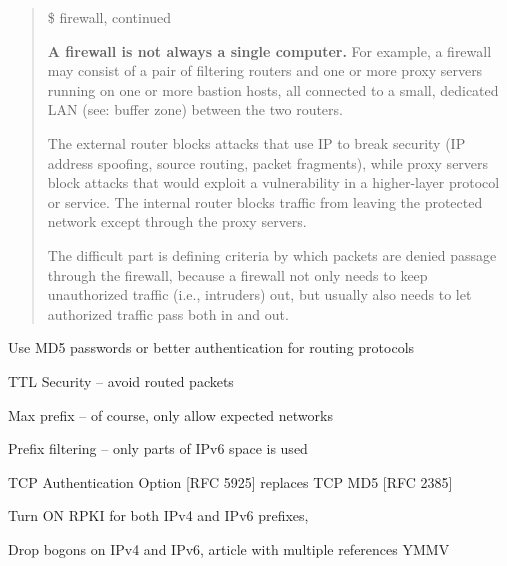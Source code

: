 \documentclass[Screen16to9,17pt]{foils}
\begin{document}
\begin{quote}
\$ firewall, continued

      {\bf A firewall is not always a single computer.} For example, a
      firewall may consist of a pair of filtering routers and one or
      more proxy servers running on one or more bastion hosts, all
      connected to a small, dedicated LAN (see: buffer zone) between the
      two routers.

      The external router blocks attacks that use IP to
      break security (IP address spoofing, source routing, packet
      fragments), while proxy servers block attacks that would exploit a
      vulnerability in a higher-layer protocol or service. The internal
      router blocks traffic from leaving the protected network except
      through the proxy servers.

      The difficult part is defining criteria by which packets are denied passage through the firewall, because
      a firewall not only needs to keep unauthorized traffic (i.e., intruders) out, but usually also needs to let authorized traffic
      pass both in and out.
\end{quote}




\begin{list2}
\item Use MD5 passwords or better authentication for routing protocols {\myalert}
\item TTL Security -- avoid routed packets
\item Max prefix -- of course, only allow expected networks
\item Prefix filtering -- only parts of IPv6 space is used
\item TCP Authentication Option [RFC 5925] replaces TCP MD5 [RFC 2385]
\item Turn ON RPKI for both IPv4 and IPv6 prefixes, {\myalert} \\
\item Drop bogons on IPv4 and IPv6, article with multiple references YMMV\\
\end{list2}



\end{document}
